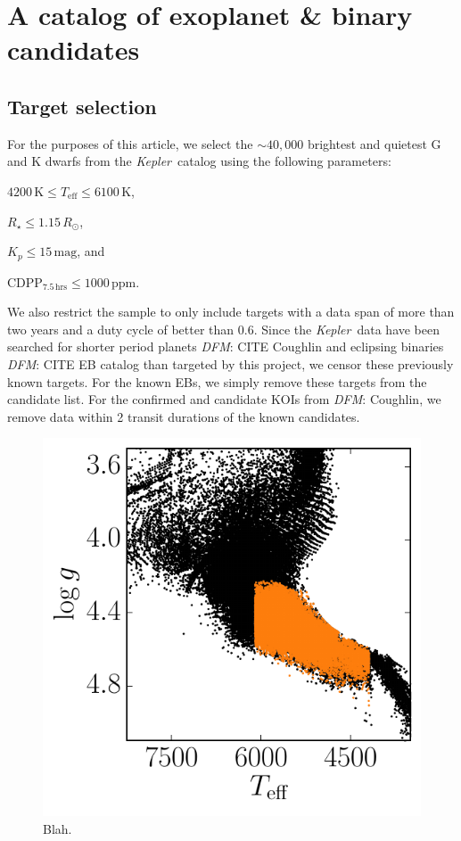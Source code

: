 \documentclass[onecolumn]{aastex6}
\newcommand{\project}[1]{\textsl{#1}}
\newcommand{\kepler}{\project{Kepler}}
\newcommand{\paper}{article}
\newcommand{\figlabel}[1]{\label{fig:#1}}
\newcommand{\sectlabel}[1]{\label{sect:#1}}
\newcommand{\unit}[1]{{\ensuremath{\,\mathrm{#1}}}}
\newcommand{\todo}[3]{{\color{#2}\emph{#1}: #3}}
\newcommand{\dfmtodo}[1]{\todo{DFM}{red}{#1}}
\begin{document}
\section{A catalog of exoplanet \& binary candidates}


\subsection{Target selection}\sectlabel{data}

For the purposes of this \paper, we select the $\sim40,000$ brightest and
quietest G and K dwarfs from the \kepler\ catalog using the following
parameters:
\begin{itemize}
{\item $4200\unit{K} \le T_\mathrm{eff} \le 6100\unit{K}$,}
{\item $R_\star \le 1.15\,R_\odot$,}
{\item $K_p \le 15\unit{mag}$, and}
{\item $\mathrm{CDPP}_{7.5\unit{hrs}} \le 1000\unit{ppm}$.}
\end{itemize}
We also restrict the sample to only include targets with a data span of more
than two years and a duty cycle of better than $0.6$.
Since the \kepler\ data have been searched for shorter period planets
\dfmtodo{CITE Coughlin} and eclipsing binaries \dfmtodo{CITE EB catalog} than
targeted by this project, we censor these previously known targets.
For the known EBs, we simply remove these targets from the candidate list.
For the confirmed and candidate KOIs from \dfmtodo{Coughlin}, we remove data
within 2 transit durations of the known candidates.

\begin{figure}
\begin{center}
\includegraphics{figures/targets.pdf}
\end{center}
\caption{%
Blah.
\figlabel{targets}}
\end{figure}
\end{document}
